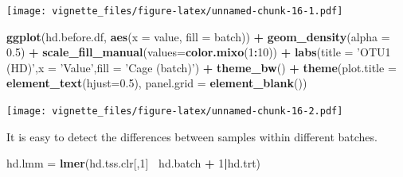 \documentclass[]{book}
\newenvironment{Shaded}{\begin{snugshade}}{\end{snugshade}}
\newcommand{\KeywordTok}[1]{\textcolor[rgb]{0.13,0.29,0.53}{\textbf{#1}}}
\newcommand{\DataTypeTok}[1]{\textcolor[rgb]{0.13,0.29,0.53}{#1}}
\newcommand{\DecValTok}[1]{\textcolor[rgb]{0.00,0.00,0.81}{#1}}
\newcommand{\FloatTok}[1]{\textcolor[rgb]{0.00,0.00,0.81}{#1}}
\newcommand{\StringTok}[1]{\textcolor[rgb]{0.31,0.60,0.02}{#1}}
\newcommand{\CommentTok}[1]{\textcolor[rgb]{0.56,0.35,0.01}{\textit{#1}}}
\newcommand{\OperatorTok}[1]{\textcolor[rgb]{0.81,0.36,0.00}{\textbf{#1}}}
\newcommand{\NormalTok}[1]{#1}
\begin{document}
\begin{Shaded}
\end{Shaded}

\texttt{[image: vignette\_files/figure-latex/unnamed-chunk-16-1.pdf]}

\begin{Shaded}
\begin{Highlighting}[]
\KeywordTok{ggplot}\NormalTok{(hd.before.df, }\KeywordTok{aes}\NormalTok{(}\DataTypeTok{x =}\NormalTok{ value, }\DataTypeTok{fill =}\NormalTok{ batch)) }\OperatorTok{+}\StringTok{ }\KeywordTok{geom_density}\NormalTok{(}\DataTypeTok{alpha =} \FloatTok{0.5}\NormalTok{) }\OperatorTok{+}\StringTok{ }\KeywordTok{scale_fill_manual}\NormalTok{(}\DataTypeTok{values=}\KeywordTok{color.mixo}\NormalTok{(}\DecValTok{1}\OperatorTok{:}\DecValTok{10}\NormalTok{)) }\OperatorTok{+}\StringTok{ }\KeywordTok{labs}\NormalTok{(}\DataTypeTok{title =} \StringTok{'OTU1 (HD)'}\NormalTok{,}\DataTypeTok{x =} \StringTok{'Value'}\NormalTok{,}\DataTypeTok{fill =} \StringTok{'Cage (batch)'}\NormalTok{) }\OperatorTok{+}\StringTok{ }\KeywordTok{theme_bw}\NormalTok{() }\OperatorTok{+}\StringTok{ }\KeywordTok{theme}\NormalTok{(}\DataTypeTok{plot.title =} \KeywordTok{element_text}\NormalTok{(}\DataTypeTok{hjust=}\FloatTok{0.5}\NormalTok{), }\DataTypeTok{panel.grid =} \KeywordTok{element_blank}\NormalTok{())}
\end{Highlighting}
\end{Shaded}

\texttt{[image: vignette\_files/figure-latex/unnamed-chunk-16-2.pdf]}

It is easy to detect the differences between samples within different
batches.

\begin{Shaded}
\begin{Highlighting}[]
\NormalTok{hd.lmm =}\StringTok{ }\KeywordTok{lmer}\NormalTok{(hd.tss.clr[,}\DecValTok{1}\NormalTok{]}\OperatorTok{~}\StringTok{ }\NormalTok{hd.batch }\OperatorTok{+}\StringTok{ }\DecValTok{1}\OperatorTok{|}\NormalTok{hd.trt)}
\end{Highlighting}
\end{Shaded}
\end{document}
